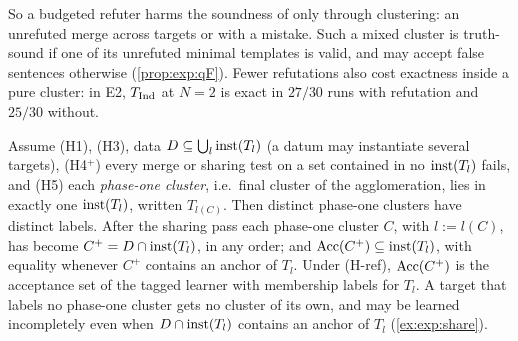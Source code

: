 So a budgeted refuter harms the soundness of \DTRC{} only through clustering: an unrefuted merge across targets or with a mistake. Such a mixed cluster is truth-sound if one of its unrefuted minimal templates is valid, and may accept false sentences otherwise (\cref{prop:exp:qF}). Fewer refutations also cost exactness inside a pure cluster: in E2, $T_{\mathrm{Ind}}$ at $N=2$ is exact in $27/30$ runs with refutation and $25/30$ without.

\begin{proposition}\label{prop:exp:share}
Assume \textup{(H1)}, \textup{(H3)}, data $D\subseteq\bigcup_l\mathrm{inst}(T_l)$ (a datum may instantiate several targets), \textup{(H4$^+$)} every merge or sharing test on a set contained in no $\mathrm{inst}(T_l)$ fails, and \textup{(H5)} each \emph{phase-one cluster}, i.e.\ final cluster of the agglomeration, lies in exactly one $\mathrm{inst}(T_l)$, written $T_{l(C)}$. Then distinct phase-one clusters have distinct labels. After the sharing pass each phase-one cluster $C$, with $l:=l(C)$, has become $C^+=D\cap\mathrm{inst}(T_l)$, in any order; and $\mathrm{Acc}(C^+)\subseteq\mathrm{inst}(T_l)$, with equality whenever $C^+$ contains an anchor of $T_l$. Under \textup{(H-ref)}, $\mathrm{Acc}(C^+)$ is the acceptance set of the tagged learner with membership labels for $T_l$. A target that labels no phase-one cluster gets no cluster of its own, and may be learned incompletely even when $D\cap\mathrm{inst}(T_l)$ contains an anchor of $T_l$ (\cref{ex:exp:share}).
\end{proposition}


